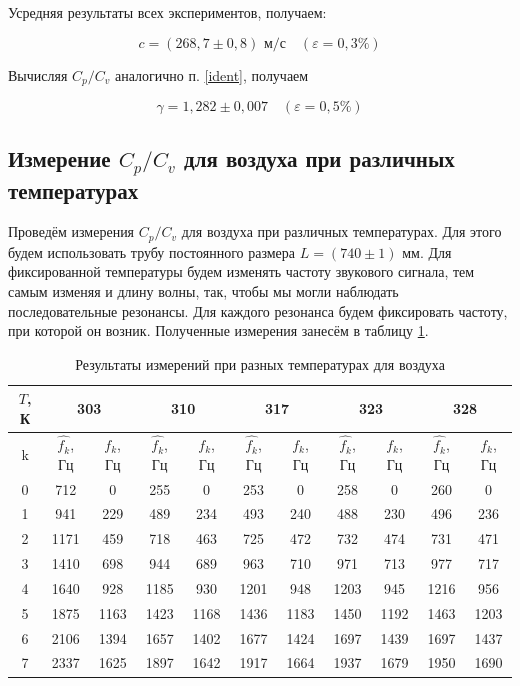 \documentclass[a4paper,12pt]{article} %
\begin{document}
Усредняя результаты всех экспериментов, получаем:

\[ \boxed{c=(268,7 \pm 0,8)  \text{ м/с}} \quad (\varepsilon=0,3\%)\]

Вычисляя $ C_p/C_v $ аналогично п. \ref{ident}, получаем

\[ \boxed{\gamma = 1,282 \pm 0,007}\quad (\varepsilon=0,5\%) \]

\subsection{Измерение $ C_p/C_v $ для воздуха при различных температурах}

Проведём измерения $ C_p/C_v $ для воздуха при различных температурах. Для этого будем использовать трубу постоянного размера $ L = (740 \pm 1) $ мм. Для фиксированной температуры будем изменять частоту звукового сигнала, тем самым изменяя и длину волны, так, чтобы мы могли наблюдать последовательные резонансы. Для каждого резонанса будем фиксировать частоту, при которой он возник. Полученные измерения занесём в таблицу \ref{tab:constL}.

\begin{table}[H]
	\centering
	\begin{tabular}{|c|c|c|c|c|c|c|c|c|c|c|}
		\hline
		$ T $, К & \multicolumn{2}{c|}{\textbf{303}} & \multicolumn{2}{c|}{\textbf{310}} & \multicolumn{2}{c|}{\textbf{317}} & \multicolumn{2}{c|}{\textbf{323}} & \multicolumn{2}{c|}{\textbf{328}} \\ \hline
		k & $ \hat{f_k} $, Гц & $ f_k $, Гц & $ \hat{f_k} $, Гц & $ f_k $, Гц & $ \hat{f_k} $, Гц & $ f_k $, Гц & $ \hat{f_k} $, Гц & $ f_k $, Гц & $ \hat{f_k} $, Гц & $ f_k $, Гц \\ \hline
		0 & 712 & 0 & 255 & 0 & 253 & 0 & 258 & 0 & 260 & 0 \\ \hline
		1 & 941 & 229 & 489 & 234 & 493 & 240 & 488 & 230 & 496 & 236 \\ \hline
		2 & 1171 & 459 & 718 & 463 & 725 & 472 & 732 & 474 & 731 & 471 \\ \hline
		3 & 1410 & 698 & 944 & 689 & 963 & 710 & 971 & 713 & 977 & 717 \\ \hline
		4 & 1640 & 928 & 1185 & 930 & 1201 & 948 & 1203 & 945 & 1216 & 956 \\ \hline
		5 & 1875 & 1163 & 1423 & 1168 & 1436 & 1183 & 1450 & 1192 & 1463 & 1203 \\ \hline
		6 & 2106 & 1394 & 1657 & 1402 & 1677 & 1424 & 1697 & 1439 & 1697 & 1437 \\ \hline
		7 & 2337 & 1625 & 1897 & 1642 & 1917 & 1664 & 1937 & 1679 & 1950 & 1690 \\ \hline
	\end{tabular}
	\caption{Результаты измерений при разных температурах для воздуха}
	\label{tab:constL}
\end{table}
\end{document}
